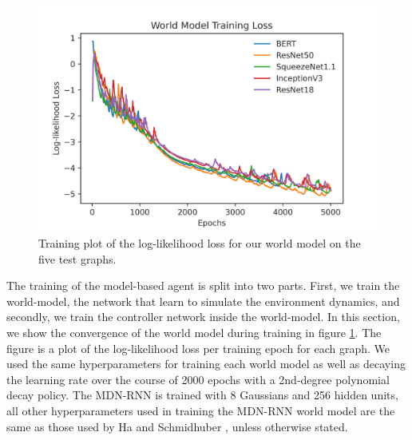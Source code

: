\begin{figure}[h]
  \centering
  \includegraphics[width=1\columnwidth]{sections/5evaluation/images/mb_training_loss}
  \caption[Log-likelihood loss of world models]{Training plot of the log-likelihood loss for our world model on the five test graphs.}
  \label{fig:eval:world-model-loss}
\end{figure}

The training of the model-based agent is split into two parts. First, we train the world-model, the network that learn to simulate the environment dynamics, and secondly, we train the controller network inside the world-model. In this section, we show the convergence of the world model during training in figure \ref{fig:eval:world-model-loss}. The figure is a plot of the log-likelihood loss per training epoch for each graph. We used the same hyperparameters for training each world model as well as decaying the learning rate over the course of 2000 epochs with a 2nd-degree polynomial decay policy. The MDN-RNN is trained with 8 Gaussians and 256 hidden units, all other hyperparameters used in training the MDN-RNN world model are the same as those used by Ha and Schmidhuber \cite{ha2018worldmodels}, unless otherwise stated.


